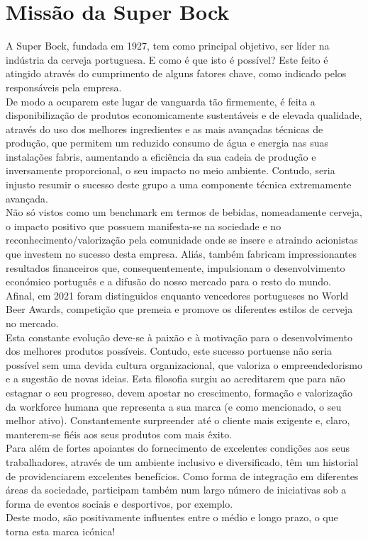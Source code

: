\chapter*{Missão da Super Bock}

A Super Bock, fundada em 1927, tem como principal objetivo, ser líder na indústria da cerveja portuguesa. E como é que isto é possível? Este feito é atingido através do cumprimento de alguns fatores chave, como indicado pelos responsáveis pela empresa.\\

De modo a ocuparem este lugar de vanguarda tão firmemente, é feita a disponibilização de produtos economicamente sustentáveis e de elevada qualidade, através do uso dos melhores ingredientes e as mais avançadas técnicas de produção, que permitem um reduzido consumo de água e energia nas suas instalações fabris, aumentando a eficiência da sua cadeia de produção e inversamente proporcional, o seu impacto no meio ambiente. Contudo, seria injusto resumir o sucesso deste grupo a uma componente técnica extremamente avançada.\\

Não só vistos como um benchmark em termos de bebidas, nomeadamente cerveja, o impacto positivo que possuem manifesta-se na sociedade e no reconhecimento/valorização pela comunidade onde se insere e atraindo acionistas que investem no sucesso desta empresa. Aliás, também fabricam impressionantes resultados financeiros que, consequentemente, impulsionam o desenvolvimento económico português e a difusão do nosso mercado para o resto do mundo. Afinal, em 2021 foram distinguidos enquanto vencedores portugueses no World Beer Awards, competição que premeia e promove os diferentes estilos de cerveja no mercado.\\ 

Esta constante evolução deve-se à paixão e à motivação para o desenvolvimento dos melhores produtos possíveis. Contudo, este sucesso portuense não seria possível sem uma devida cultura organizacional, que valoriza o empreendedorismo e a sugestão de novas ideias. Esta filosofia surgiu ao acreditarem que para não estagnar o seu progresso, devem apostar no crescimento, formação e valorização da workforce humana que representa a sua marca (e como mencionado, o seu melhor ativo). Constantemente surpreender até o cliente mais exigente e, claro, manterem-se fiéis aos seus produtos com mais êxito.\\
 

Para além de fortes apoiantes do fornecimento de excelentes condições aos seus trabalhadores, através de um ambiente inclusivo e diversificado, têm um historial de providenciarem excelentes benefícios. Como forma de integração em diferentes áreas da sociedade, participam também num largo número de iniciativas sob a forma de eventos sociais e desportivos, por exemplo.\\

Deste modo, são positivamente influentes entre o médio e longo prazo, o que torna esta marca icónica!\\ 
